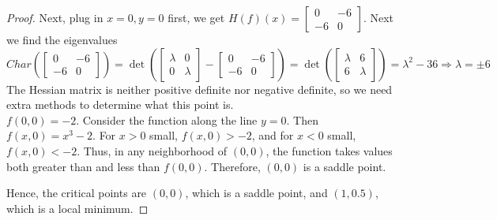 \documentclass{article}
\begin{document}
\begin{proof}
    Next, plug in $x=0, y=0$ first, we get 
          $H(f)(x)=\begin{bmatrix}
         0 & -6 \\
         -6 & 0
     \end{bmatrix}.$ Next we find the eigenvalues           $$Char(\begin{bmatrix}
         0 & -6 \\
         -6 & 0
     \end{bmatrix})= \det(\begin{bmatrix}
         \lambda & 0 \\
         0 & \lambda
     \end{bmatrix} - \begin{bmatrix}
         0 & -6 \\
         -6 & 0
     \end{bmatrix}) = \det(\begin{bmatrix}
         \lambda & 6 \\
         6 & \lambda
     \end{bmatrix}) =\lambda^2-36 \Rightarrow \lambda = \pm 6 $$
     The Hessian matrix is neither positive definite nor negative definite, so we need extra methods to determine what this point is. \\
     $f(0,0)=-2$. Consider the function along the line $y=0$. Then $f(x,0)=x^3-2$. For $x>0$ small, $f(x,0)>-2$, and for $x<0$ small, $f(x,0)<-2$. Thus, in any neighborhood of $(0,0)$, the function takes values both greater than and less than $f(0,0)$. Therefore, $(0,0)$ is a saddle point.

     Hence, the critical points are $(0,0)$, which is a saddle point, and $(1,0.5)$, which is a local minimum.
\end{proof}
\end{document}
